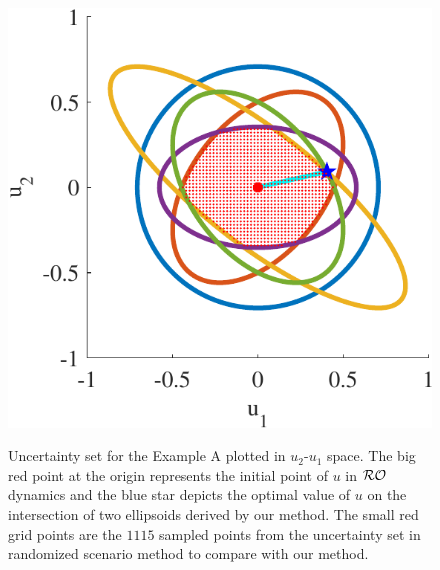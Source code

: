 \documentclass[journal,twoside,web]{ieeecolor}
\begin{document}
\begin{figure}
\begin{center}
\includegraphics[scale=0.55]{ellipsoids}
\vspace{-1.5mm}
\caption{Uncertainty set for the Example A plotted in $u_
2$-$u_1$ space. The big red point at the origin represents the initial point of $u$ in ${\cal RO}$ dynamics and the blue star depicts the optimal value of $u$ on the intersection of two ellipsoids derived by our method. The small red grid points are the $1115$ sampled points from the uncertainty set in randomized scenario method \cite{calafiore2004} to compare with our method.}
\vspace{-8mm}
\label{ellipsoids}
\end{center}
\end{figure}
\end{document}
